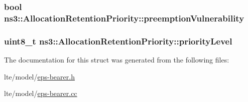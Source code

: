 \subsubsection[{\texorpdfstring{preemption\+Vulnerability}{preemptionVulnerability}}]{\setlength{\rightskip}{0pt plus 5cm}bool ns3\+::\+Allocation\+Retention\+Priority\+::preemption\+Vulnerability}\hypertarget{structns3_1_1AllocationRetentionPriority_a29216b3ead08a2dba4eacf84a3b3fc35}{}\label{structns3_1_1AllocationRetentionPriority_a29216b3ead08a2dba4eacf84a3b3fc35}
\subsubsection[{\texorpdfstring{priority\+Level}{priorityLevel}}]{\setlength{\rightskip}{0pt plus 5cm}uint8\+\_\+t ns3\+::\+Allocation\+Retention\+Priority\+::priority\+Level}\hypertarget{structns3_1_1AllocationRetentionPriority_a8b4f5cf9b31a4994f98ac7740ca3f5aa}{}\label{structns3_1_1AllocationRetentionPriority_a8b4f5cf9b31a4994f98ac7740ca3f5aa}


The documentation for this struct was generated from the following files\+:\begin{DoxyCompactItemize}
\item 
lte/model/\hyperlink{eps-bearer_8h}{eps-\/bearer.\+h}\item 
lte/model/\hyperlink{eps-bearer_8cc}{eps-\/bearer.\+cc}\end{DoxyCompactItemize}
